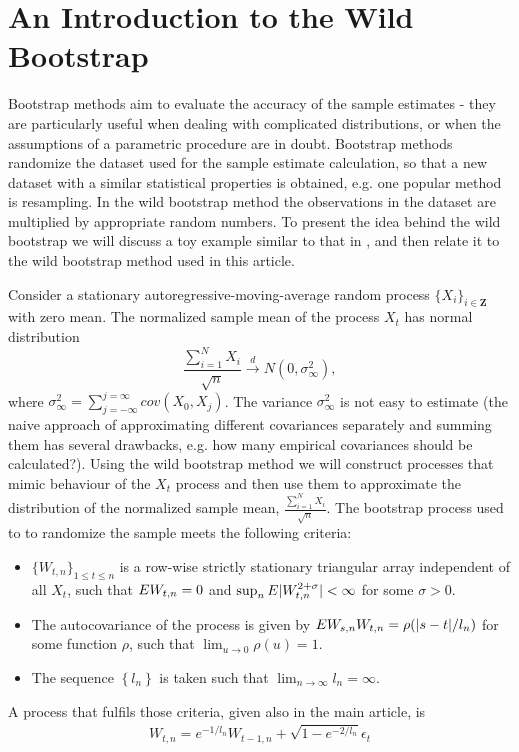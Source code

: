 



\section{An Introduction to the Wild Bootstrap}
\label{wildintro}
Bootstrap methods aim to evaluate the accuracy of the sample estimates - they are particularly useful when dealing with complicated distributions, or when the assumptions of a parametric procedure are in doubt. Bootstrap methods randomize the dataset used for the sample estimate calculation, so that a new dataset with a similar statistical properties is obtained, e.g. one popular method is resampling. In the wild bootstrap method  the observations in the dataset are multiplied by  appropriate random numbers. To present the idea behind the wild bootstrap we will discuss a toy example similar to that in \cite{Shao2010}, and then relate it to the wild bootstrap method used in this article. 

Consider a stationary autoregressive-moving-average random process $\{X_i\}_{i \in \mathbf{Z}}$ with zero mean. The normalized sample mean of the process $X_t$ has normal distribution
\begin{equation}
\frac{\sum_{i=1}^{N} X_i}{\sqrt{n}} \overset{d}{\to} N(0,\sigma_{\infty}^{2}),    
\end{equation}      
where $\sigma_{\infty}^2 = \sum_{j=-\infty}^{j=\infty} cov(X_0,X_j)$. The variance $\sigma_{\infty}^2$ is not easy to estimate (the naive approach of approximating different covariances separately and summing them has several drawbacks, e.g. how many empirical covariances should be calculated?). Using the wild bootstrap method we will construct processes that mimic behaviour of the $X_t$ process and then use them to approximate the distribution of the normalized sample mean, $\frac{\sum_{i=1}^{N} X_i}{\sqrt{n}}$. The bootstrap process used to to randomize the sample meets the following criteria: 
\begin{itemize}
\item $\{W_{t,n}\}_{1 \leq t \leq n }$ is a row-wise strictly stationary triangular array independent of all $X_t$, such that $E W_{t,n}=0$ and $\sup_{n} E|W_{t,n}^{2+\sigma}| < \infty$ for some $\sigma > 0$. 
\item The autocovariance of the process is given by $E W_{s,n} W_{t,n}=\rho(|s-t|/l_n)$ for some function $\rho$, such that $\lim_{u \to 0} \rho(u) = 1$. 
\item The sequence $\left\{l_n\right\}$ is taken such that $\lim_{n \to \infty} l_n = \infty$.
\end{itemize}
A process that fulfils those criteria, given also in the main article, is
\begin{align}
W_{t,n} = e^{-1/l_n}W_{t-1,n} + \sqrt{1 -e^{-2/l_n}} \epsilon_t
\end{align} 
  
